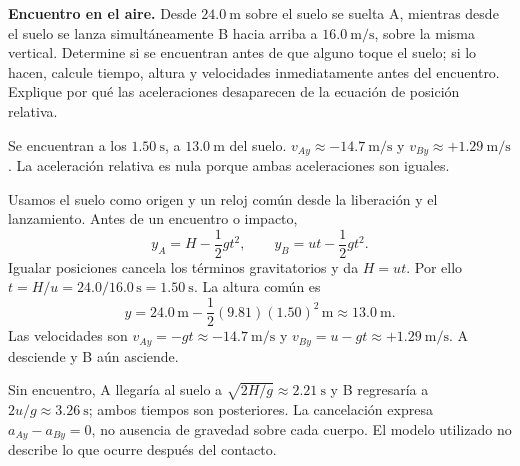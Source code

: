 \begin{ejercicio}
\textbf{Encuentro en el aire.} Desde \(\SI{24.0}{\meter}\) sobre el suelo se suelta A, mientras desde el suelo se lanza simultáneamente B hacia arriba a \(\SI{16.0}{\meter\per\second}\), sobre la misma vertical. Determine si se encuentran antes de que alguno toque el suelo; si lo hacen, calcule tiempo, altura y velocidades inmediatamente antes del encuentro. Explique por qué las aceleraciones desaparecen de la ecuación de posición relativa.
\end{ejercicio}
\begin{respuesta}
Se encuentran a los \(\SI{1.50}{\second}\), a \(\SI{13.0}{\meter}\) del suelo. \(v_{Ay}\approx-\SI{14.7}{\meter\per\second}\) y \(v_{By}\approx+\SI{1.29}{\meter\per\second}\). La aceleración relativa es nula porque ambas aceleraciones son iguales.
\end{respuesta}
\begin{explicacion}
Usamos el suelo como origen y un reloj común desde la liberación y el lanzamiento. Antes de un encuentro o impacto,
\[ y_A=H-\frac12gt^2,\qquad y_B=ut-\frac12gt^2. \]
Igualar posiciones cancela los términos gravitatorios y da \(H=ut\). Por ello \(t=H/u=24.0/16.0\,\si{\second}=\SI{1.50}{\second}\). La altura común es
\[ y=24.0\,\si{\meter}-\frac12(9.81)(1.50)^2\,\si{\meter}\approx\SI{13.0}{\meter}. \]
Las velocidades son \(v_{Ay}=-gt\approx-\SI{14.7}{\meter\per\second}\) y \(v_{By}=u-gt\approx+\SI{1.29}{\meter\per\second}\). A desciende y B aún asciende.

Sin encuentro, A llegaría al suelo a \(\sqrt{2H/g}\approx\SI{2.21}{\second}\) y B regresaría a \(2u/g\approx\SI{3.26}{\second}\); ambos tiempos son posteriores. La cancelación expresa \(a_{Ay}-a_{By}=0\), no ausencia de gravedad sobre cada cuerpo. El modelo utilizado no describe lo que ocurre después del contacto.
\end{explicacion}

